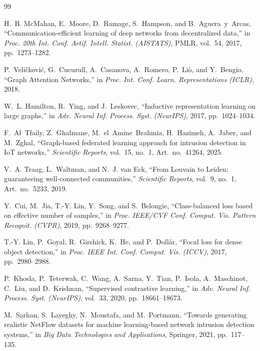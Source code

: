 \documentclass[journal,onecolumn]{IEEEtran}
\begin{document}
\begin{thebibliography}{99}

H.~B. McMahan, E.~Moore, D.~Ramage, S.~Hampson, and B.~Aguera~y~Arcas, ``Communication-efficient learning of deep networks from decentralized data,'' in \emph{Proc. 20th Int. Conf. Artif. Intell. Statist. (AISTATS)}, PMLR, vol.~54, 2017, pp.~1273--1282.

P.~Veli{\v{c}}kovi{\'{c}}, G.~Cucurull, A.~Casanova, A.~Romero, P.~Li{\`{o}}, and Y.~Bengio, ``Graph Attention Networks,'' in \emph{Proc. Int. Conf. Learn. Representations (ICLR)}, 2018.

W.~L. Hamilton, R.~Ying, and J.~Leskovec, ``Inductive representation learning on large graphs,'' in \emph{Adv. Neural Inf. Process. Syst. (NeurIPS)}, 2017, pp.~1024--1034.

F.~Al~Tfaily, Z.~Ghalmane, M.~el~Amine~Brahmia, H.~Hazimeh, A.~Jaber, and M.~Zghal, ``Graph-based federated learning approach for intrusion detection in IoT networks,'' \emph{Scientific Reports}, vol.~15, no.~1, Art.~no.~41264, 2025.

V.~A. Traag, L.~Waltman, and N.~J. van Eck, ``From Louvain to Leiden: guaranteeing well-connected communities,'' \emph{Scientific Reports}, vol.~9, no.~1, Art.~no.~5233, 2019.

Y.~Cui, M.~Jia, T.-Y. Lin, Y.~Song, and S.~Belongie, ``Class-balanced loss based on effective number of samples,'' in \emph{Proc. IEEE/CVF Conf. Comput. Vis. Pattern Recognit. (CVPR)}, 2019, pp.~9268--9277.

T.-Y. Lin, P.~Goyal, R.~Girshick, K.~He, and P.~Doll{\'{a}}r, ``Focal loss for dense object detection,'' in \emph{Proc. IEEE Int. Conf. Comput. Vis. (ICCV)}, 2017, pp.~2980--2988.

P.~Khosla, P.~Teterwak, C.~Wang, A.~Sarna, Y.~Tian, P.~Isola, A.~Maschinot, C.~Liu, and D.~Krishnan, ``Supervised contrastive learning,'' in \emph{Adv. Neural Inf. Process. Syst. (NeurIPS)}, vol.~33, 2020, pp.~18661--18673.

M.~Sarhan, S.~Layeghy, N.~Moustafa, and M.~Portmann, ``Towards generating realistic {NetFlow} datasets for machine learning-based network intrusion detection systems,'' in \emph{Big Data Technologies and Applications}, Springer, 2021, pp.~117--135.


\end{thebibliography}
\end{document}
